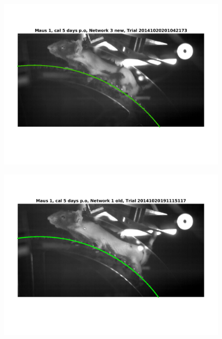\documentclass[
	fontsize=12pt,
	paper=a4,
	twoside=false,
	numbers=noenddot,
	plainheadsepline,
	toc=listof,
	toc=bibliography
]{scrartcl}
\begin{document}
\begin{figure} [hb] \centering
	\includegraphics[scale = 0.6]{images/mouse1/result_Maus_1_cal_5_days_Network_3_new_2.png}
\end{figure}
\begin{figure} [htb] \centering
	\includegraphics[scale = 0.6]{images/mouse1/result_Maus_1_cal_5_days_Network_1_old.png}
\end{figure}


\end{document}

